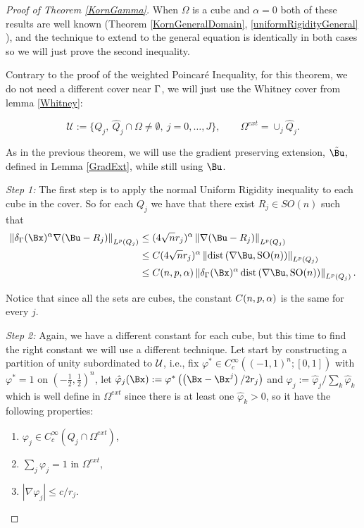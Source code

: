 \begin{proof}[Proof of Theorem \ref{KornGamma}]
  
    When $\Omega$ is a cube and $\alpha=0$ both of these results are well known (Theorem \ref{KornGeneralDomain}, \ref{uniformRigidityGeneral} ), and the technique to extend to the general equation is identically in both cases so we will just prove the second inequality.

    Contrary to the proof of the weighted Poincaré Inequality, for this theorem, we do not need a different cover near $\Gamma$, we will just use the  Whitney cover  from  lemma \ref{Whitney}:
    
    $$\mathcal{U}:= \{Q_j,\ \hat{Q}_j\cap\Omega\neq \emptyset,  \ j=0,\ldots,J \},\qquad \Omega^{ext}= \cup_j \hat{Q}_j.$$

    As in the previous theorem, we will use the gradient preserving extension, $\tilde{\Bu}$, defined in Lemma \ref{GradExt}, while still using $\Bu$.
    
    \textit{Step 1:} The first step is to apply the normal Uniform Rigidity inequality to each cube in the cover. So for each $Q_j$ we have that there exist $R_j\in SO(n)$ such that
    \begin{align*}    
        \left\|\delta_\GG(\Bx)^\alpha\nabla (\Bu-R_j)\right\|_{L^p(Q_j)} & \leq (4\sqrt{n} r_j)^\alpha \left\|\nabla (\Bu-R_j)\right\|_{L^p(Q_j)}\\ &\leq C (4\sqrt{n} r_j)^\alpha \left\|\operatorname{dist}\left(\nabla \Bu, \mathrm{SO}(n)\right)\right\|_{L^p(Q_j)}\\
        &\leq C(n,p,\alpha)  \left\|\delta_\GG(\Bx)^\alpha \operatorname{dist}\left(\nabla \Bu, \mathrm{SO}(n)\right)\right\|_{L^p(Q_j)}.
    \end{align*}

    Notice that since all the sets are cubes, the constant $C(n,p,\alpha)$ is the same for every $j$.
    
    \textit{Step 2:} Again, we have a different constant for each cube, but this time to find the right constant we will use a different technique.  Let start by constructing a partition of unity subordinated to ${\mathcal U}$,  i.e., fix $\varphi^* \in C_c^{\infty}\left((-1,1)^n ;[0,1]\right)$ with $\varphi^*=1$ on $\left(-\frac{1}{2}, \frac{1}{2}\right)^n$, let $\hat{\varphi}_j(\Bx):=\varphi^*\left(\left(\Bx-\Bx^j\right) / 2r_j\right)$ and $\varphi_j:=\hat{\varphi}_j / \sum_k \hat{\varphi}_k$ which is well define in $\Omega^{ext}$ since there is at least one $\hat{\varphi}_k>0$, so it have the following properties:
    \begin{enumerate}
            \item $\varphi_j \in C_c^{\infty}\left(Q_j\cap \Omega^{ext}\right)$,
            \item $ \sum_j \varphi_j=1$ in $\Omega^{ext}$,
            \item $\left|\nabla \varphi_j\right| \leq c / r_j$. 
    \end{enumerate}


\end{proof}
